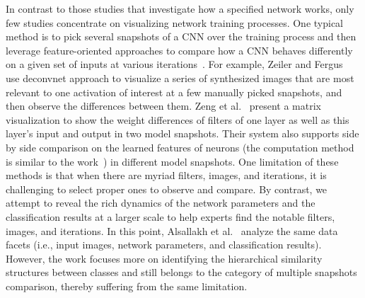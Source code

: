 \documentclass[format=acmsmall, review=false, screen=true]{acmart}
\newcommand{\ti}{\textcolor[rgb]{0,0,0}}
\begin{document}
In contrast to those studies that investigate how a specified network works, only few studies concentrate on visualizing network training processes.
One typical method is to pick several snapshots of a CNN over the training process and then leverage feature-oriented approaches to compare how a CNN behaves differently on a given set of inputs at various iterations~\cite{zeiler2014visualizing, chung2016revacnn, zeng2017cnncomparator, alsallakh2018convolutional}.
For example, Zeiler and Fergus~\cite{zeiler2014visualizing} use deconvnet approach to visualize a series of synthesized images that are most relevant to one activation of interest at a few manually picked snapshots, and then observe the differences between them.
\ti{
Zeng et al.~\cite{zeng2017cnncomparator} present a matrix visualization to show the weight differences of filters of one layer as well as this layer's input and output in two model snapshots. Their system also supports side by side comparison on the learned features of neurons (the computation method is similar to the work~\cite{girshick2014rich}) in different model snapshots.
One limitation of these methods is that when there are myriad filters, images, and iterations, it is challenging to select proper ones to observe and compare.
By contrast, we attempt to reveal the rich dynamics of the network parameters and the classification results at a larger scale to help experts find the notable filters, images, and iterations.
In this point, Alsallakh et al.~\cite{alsallakh2018convolutional} analyze the same data facets (i.e., input images, network parameters, and classification results). However, the work focuses more on identifying the hierarchical similarity structures between classes and still belongs to the category of multiple snapshots comparison, thereby suffering from the same limitation. 
}
\end{document}
